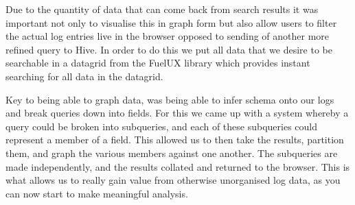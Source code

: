 Due to the quantity of data that can come back from search
results it was
important not only to visualise this in graph form but
also allow users to
filter the actual log entries live in the browser opposed
to sending of another
more refined query to Hive. In order to do this we put all
data that we desire
to be searchable in a datagrid from the FuelUX\cite{fuelux} library
which provides instant
searching for all data in the datagrid.

Key to being able to graph data, was being able to infer
schema onto our logs and break queries down into fields. For
this we came up with a system whereby a query could be
broken into subqueries, and each of these subqueries could
represent a member of a field. This allowed us to then take
the results, partition them, and graph the various members
against one another. The subqueries are made independently,
and the results collated and returned to the browser. This
is what allows us to really gain value from otherwise
unorganised log data, as you can now start to make
meaningful analysis.

